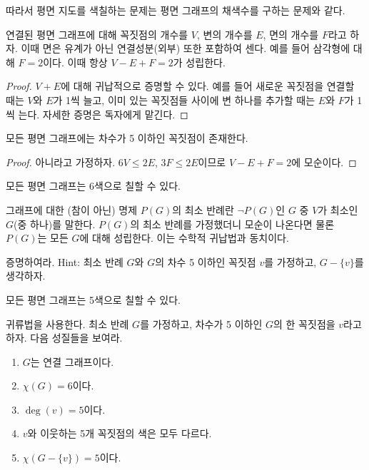 따라서 평면 지도를 색칠하는 문제는 평면 그래프의 채색수를 구하는 문제와 같다. 
\begin{theorem}[Euler]\label{thm:euler}
    연결된 평면 그래프에 대해 꼭짓점의 개수를 $V$, 변의 개수를 $E$, 면의 개수를 $F$라고 하자. 이때 면은 유계가 아닌 연결성분(외부) 또한 포함하여 센다. 예를 들어 삼각형에 대해 $F=2$이다. 이때 항상 $V-E+F=2$가 성립한다. 
\end{theorem}
\begin{proof}
    $V+E$에 대해 귀납적으로 증명할 수 있다. 예를 들어 새로운 꼭짓점을 연결할 때는 $V$와 $E$가 1씩 늘고, 이미 있는 꼭짓점들 사이에 변 하나를 추가할 때는 $E$와 $F$가 1씩 는다. 자세한 증명은 독자에게 맡긴다. 
\end{proof}
\begin{theorem}
    모든 평면 그래프에는 차수가 5 이하인 꼭짓점이 존재한다. 
\end{theorem}
\begin{proof}
아니라고 가정하자. $6V\leq 2E$, $3F\leq 2E$이므로 $V-E+F=2$에 모순이다. 
\end{proof}
\begin{corollary}
    모든 평면 그래프는 6색으로 칠할 수 있다. 
\end{corollary}
\begin{definition}
    그래프에 대한 (참이 아닌) 명제 $P(G)$의 최소 반례란 $\neg P(G)$인 $G$ 중 $V$가 최소인 $G$(중 하나)를 말한다. $P(G)$의 최소 반례를 가정했더니 모순이 나온다면 물론 $P(G)$는 모든 $G$에 대해 성립한다. 이는 수학적 귀납법과 동치이다. 
\end{definition}
\begin{exercise}
    증명하여라. Hint: 최소 반례 $G$와 $G$의 차수 5 이하인 꼭짓점 $v$를 가정하고, $G-\{v\}$를 생각하자. 
\end{exercise}
\begin{theorem}\label{thm:fivecolor}
    모든 평면 그래프는 5색으로 칠할 수 있다. 
\end{theorem}
\begin{exercise}
    귀류법을 사용한다. 최소 반례 $G$를 가정하고, 차수가 5 이하인 $G$의 한 꼭짓점을 $v$라고 하자. 다음 성질들을 보여라. 
    \begin{enumerate}
        \item $G$는 연결 그래프이다.
        \item $\chi(G)=6$이다. 
        \item $\deg(v)=5$이다. 
        \item $v$와 이웃하는 5개 꼭짓점의 색은 모두 다르다. 
        \item $\chi(G-\{v\})=5$이다. 
    \end{enumerate}
\end{exercise}
